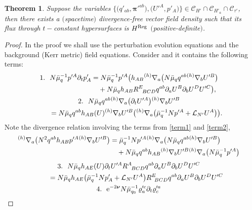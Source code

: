 \documentclass[11pt]{article}
\numberwithin{equation}{section}
\def\ptl{\partial}%
\def\mbo#1{\boldsymbol{#1}}%
\def\grad{{\nabla}}%
\newcommand{\leftexp}[2]{{\vphantom{#2}}^{#1}{#2}}
\numberwithin{equation}{section}
\newtheorem{Theorem}{Theorem}[section]
\begin{document}
\begin{Theorem}
Suppose the variables $\bigl\{ \bigl(q'_{ab}, \mbo{\pi}'^{ab}\bigr), \bigl(U'^A, p'_A\bigr) \bigr\} \in \mathscr{C}_{H'} \cap \mathscr{C}_{H'_a} \cap \mathscr{C}_{\tau'}$, then there exists a $($spacetime$)$ divergence-free vector field density such that its flux through $t-$constant hypersurfaces is $H^{{\rm Reg}}$ $($positive-definite$)$.
\end{Theorem}
\begin{proof}
In the proof we shall use the perturbation evolution equations and the background (Kerr metric) field equations. Consider \smash{$\ptl_t \mathbf{e}^{{\rm Reg}}$} and it contains the following terms:
\begin{gather}
1. \ \ N \bar{\mu}^{-1}_q p'^A \ptl_t p'_A= N \bar{\mu}^{-1}_q p'^A \bigl(h_{AB} \leftexp{(h)}{\grad}_a \bigl(N \bar{\mu}_q q^{ab} \leftexp{(h)}{\grad}_b U'^B\bigr) \notag\\
\hphantom{1. \ N \bar{\mu}^{-1}_q p'^A \ptl_t p'_A=}{} + N \bar{\mu}_q h_{AB} R^E_{\,\,\,\, BCD} q^{ab} \ptl_a U^B \ptl_b U^D U'^C \bigr),\label{term1}
\\
2. \ \ N \bar{\mu}_q q^{ab} \leftexp{(h)}{\grad}_a \bigl(\ptl_t U'^A\bigr) \leftexp{(h)}{\grad}_b U'^B \notag\\
 \qquad{}= N \bar{\mu}_q q^{ab} h_{AB}(U) \leftexp{(h)}{\grad}_b U'^B \bigl(\leftexp{(h)}{\grad}_a \bigl(\bar{\mu}^{-1}_q Np'^A + \mathcal{L}_{N'} U^A\bigr)\bigr).\label{term2}
 \end{gather}
 Note the divergence relation involving the terms from \eqref{term1} and \eqref{term2},
 \begin{align*}
 \leftexp{(h)}{\grad}_a \bigl(N^2 q^{ab} h_{AB} p'^A \leftexp{(h)}{\grad}_b U'^B\bigr) &{}= \bar{\mu}^{-1}_q N p'^A \leftexp{(h)}{\grad}_a \bigl(N \bar{\mu}_q q^{ab} \leftexp{(h)}{\grad}_b U'^B\bigr) \notag\\
 & \quad{}+ N \bar{\mu}_q q^{ab} h_{AB} \leftexp{(h)}{\grad}_b U'^B \leftexp{(h)}{\grad}_a \bigl(N \bar{\mu}^{-1}_q p'^A\bigr)
 \end{align*}
\begin{gather*}
3. \ \ N \bar{\mu}_q h_{AE}(U) \ptl_t U'^A R^A_{\,\,\,\,BCD} q^{ab} \ptl_a U^B \ptl_b U^D U'^C \notag\\
 \qquad{}=N \bar{\mu}_q h_{AE} \bigl(\bar{\mu}^{-1}_q N p'_A + \mathcal{L}_{N'} U^A\bigr) R^E_{\,\,\,BCD} q^{ab} \ptl_a U^B \ptl_b U^D U'^C
\\
 4. \ \ {\rm e}^{-2 \mbo{\nu}} N \bar{\mu}^{-1}_{q_0} \varrho'^c_a \ptl_t \varrho'^a_c \\

\end{gather*}
\end{proof}
\end{document}
